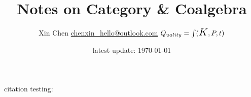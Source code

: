 \documentclass[12pt]{article} %
\title{Notes on Category \& Coalgebra}
\author{Xin Chen \qquad \href{mailto:chenxin_hello@outlook.com}{\textsf{chenxin\_hello@outlook.com}}  
	\qquad 
	$Q_{uality} = \int (\text{\Large $K$},P,t)$}
\date{latest update: \today}
\begin{document}
\maketitle
\tableofcontents


\medskip

citation testing: \cite{Smi2024,Lan2018,SEP-category}







\clearpage
% 

% 
\printbibliography
{}
\end{document}
